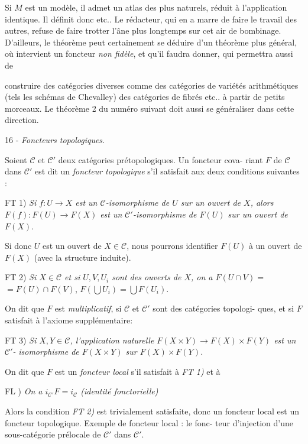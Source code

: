 Si $M$ est un modèle, il admet un atlas des plus naturels, réduit à
l'application identique. Il définit donc etc.. Le rédacteur, qui en a
marre de faire le travail des autres, refuse de faire trotter l'âne
plus longtemps sur cet air de bombinage. D'ailleurs, le théorème peut
certainement se déduire d'un théorème plus général, où intervient un
foncteur \emph{non fidèle}, et qu'il faudra donner, qui permettra aussi de

\newpage



construire des catégories diverses comme des catégories de variétés
arithmétiques (tels les schémas de Chevalley) des catégories de fibrés
etc.. à partir de petits morceaux. Le théorème 2 du numéro suivant doit
aussi se généraliser dans cette direction.

16 - \emph{Foncteurs topologiques}.

Soient $\mathcal{C}$ et $\mathcal{C}'$ deux catégories prétopologiques. Un foncteur cova-
riant $F$ de $\mathcal{C}$ dans $\mathcal{C}'$ est dit un \emph{foncteur topologique} s'il satisfait
aux deux conditions suivantes :

FT 1) \emph{Si $f: U \rightarrow X$ est un $\mathcal{C}$-isomorphisme de $U$ sur un ouvert de $X$, alors }
$F(f): F(U) \rightarrow F(X)$ \emph{est un $\mathcal{C}'$-isomorphisme de $F(U)$ sur un ouvert de }
$F(X)$.

Si donc $U$ est un ouvert de $X \in \mathcal{C}$, nous pourrons identifier $F(U)$ à un
ouvert de $F(X)$ (avec la structure induite).

FT 2) \emph{Si $X \in \mathcal{C}$ et si $U, V, U_i$ sont des ouverts de $X$, on a $F(U \cap V) =$}
$= F(U) \cap F(V)$, $F(\bigcup U_i) = \bigcup F(U_i)$.

On dit que $F$ est \emph{multiplicatif}, si $\mathcal{C}$ et $\mathcal{C}'$ sont des catégories topologi-
ques, et si $F$ satisfait à l'axiome supplémentaire:

FT 3) \emph{Si $X,Y \in \mathcal{C}$, l'application naturelle $F(X \times Y) \rightarrow F(X) \times F(Y)$ est un $\mathcal{C}'$-}
\emph{isomorphisme de $F(X \times Y)$ sur $F(X) \times F(Y)$.}

On dit que $F$ est un \emph{foncteur local} s'il satisfait à \emph{FT 1)} et à

FL ) \emph{On a $i_{\mathcal{C}'} F = i_{\mathcal{C}}$ (identité fonctorielle)}

Alors la condition \emph{FT 2)} est trivialement satisfaite, donc un foncteur
local est un foncteur topologique. Exemple de foncteur local : le fonc-
teur d'injection d'une sous-catégorie prélocale de $\mathcal{C}'$ dans $\mathcal{C}'$.

